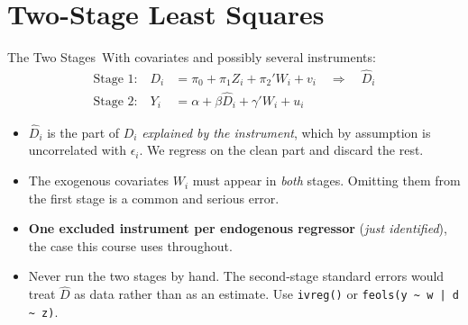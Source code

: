 \documentclass[aspectratio=169,11pt,xcolor=dvipsnames]{beamer}
\newcommand{\core}{\,\raisebox{0.6pt}{\textcolor{corestar}{$\bigstar$}}}
\begin{document}
\section[2SLS]{Two-Stage Least Squares}
\begin{frame}\sectionpage\end{frame}

\begin{frame}{The Two Stages\core}
With covariates and possibly several instruments:
\begin{align*}
  \text{Stage 1:}\quad D_i &= \pi_0 + \pi_1 Z_i + \pi_2' W_i + v_i
  \quad\Longrightarrow\quad \hat D_i \\[3pt]
  \text{Stage 2:}\quad Y_i &= \alpha + \beta \hat D_i + \gamma' W_i + u_i
\end{align*}
\vskip3pt
\begin{itemize}\itemsep3pt
  \item $\hat D_i$ is the part of $D_i$ \emph{explained by the instrument}, which
        by assumption is uncorrelated with $\epsilon_i$. We regress on the clean
        part and discard the rest.
  \item \alert{The exogenous covariates $W_i$ must appear in \emph{both} stages.}
        Omitting them from the first stage is a common and serious error.
  \item \textbf{One excluded instrument per endogenous regressor}
        (\emph{just identified}), the case this course uses throughout.
  \item \alert{Never run the two stages by hand.} The second-stage standard errors
        would treat $\hat D$ as data rather than as an estimate. Use
        \texttt{ivreg()} or \texttt{feols(y \textasciitilde\ w | d \textasciitilde\ z)}.
\end{itemize}
\end{frame}
\end{document}
